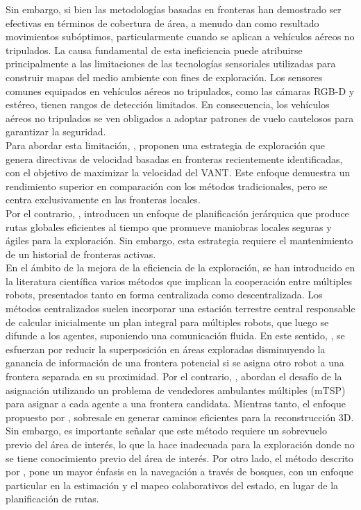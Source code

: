 \documentclass[sigconf]{acmart}
\begin{document}
Sin embargo, si bien las metodologías basadas en fronteras han demostrado ser efectivas en términos de cobertura de área, a menudo dan como resultado movimientos subóptimos, particularmente cuando se aplican a vehículos aéreos no tripulados. La causa fundamental de esta ineficiencia puede atribuirse principalmente a las limitaciones de las tecnologías sensoriales utilizadas para construir mapas del medio ambiente con fines de exploración. Los sensores comunes equipados en vehículos aéreos no tripulados, como las cámaras RGB-D y estéreo, tienen rangos de detección limitados. En consecuencia, los vehículos aéreos no tripulados se ven obligados a adoptar patrones de vuelo cautelosos para garantizar la seguridad.\\

Para abordar esta limitación, \citeauthor{CIESLEWSKI2017} \cite{CIESLEWSKI2017}, proponen una estrategia de exploración que genera directivas de velocidad basadas en fronteras recientemente identificadas, con el objetivo de maximizar la velocidad del VANT. Este enfoque demuestra un rendimiento superior en comparación con los métodos tradicionales, pero se centra exclusivamente en las fronteras locales.\\

Por el contrario, \citeauthor{FUEL} \cite{FUEL}, introducen un enfoque de planificación jerárquica que produce rutas globales eficientes al tiempo que promueve maniobras locales seguras y ágiles para la exploración. Sin embargo, esta estrategia requiere el mantenimiento de un historial de fronteras activas.\\

En el ámbito de la mejora de la eficiencia de la exploración, se han introducido en la literatura científica varios métodos que implican la cooperación entre múltiples robots, presentados tanto en forma centralizada como descentralizada. Los métodos centralizados suelen incorporar una estación terrestre central responsable de calcular inicialmente un plan integral para múltiples robots, que luego se difunde a los agentes, suponiendo una comunicación fluida. En este sentido, \citeauthor{1435481} \cite{1435481}, se esfuerzan por reducir la superposición en áreas exploradas disminuyendo la ganancia de información de una frontera potencial si se asigna otro robot a una frontera separada en su proximidad. Por el contrario, \citeauthor{Tian} \cite{Tian}, abordan el desafío de la asignación utilizando un problema de vendedores ambulantes múltiples (mTSP) para asignar a cada agente a una frontera candidata. Mientras tanto, el enfoque propuesto por \citeauthor{9844235} \cite{9844235}, sobresale en generar caminos eficientes para la reconstrucción 3D. Sin embargo, es importante señalar que este método requiere un sobrevuelo previo del área de interés, lo que la hace inadecuada para la exploración donde no se tiene conocimiento previo del área de interés. Por otro lado, el método descrito por \citeauthor{Tian} \cite{Tian}, pone un mayor énfasis en la navegación a través de bosques, con un enfoque particular en la estimación y el mapeo colaborativos del estado, en lugar de la planificación de rutas.\\
\end{document}
